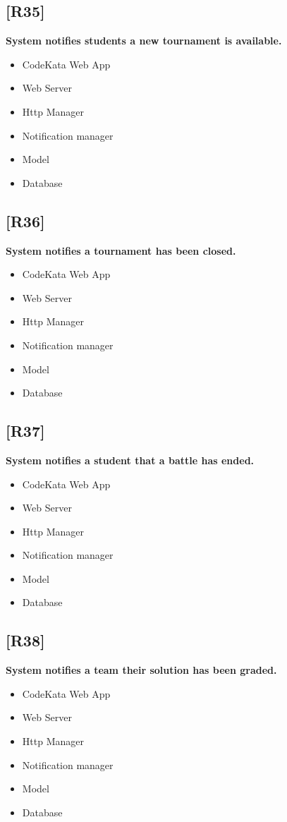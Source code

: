 \documentclass{article}
\begin{document}
\subsection{[R35]}
\textbf{ System notifies students a new tournament is available. }
\begin{itemize}
\item CodeKata Web App
\item Web Server
\item Http Manager
\item Notification manager
\item Model
\item Database
\end{itemize}
\subsection{[R36]}
\textbf{ System notifies a tournament has been closed.}
\begin{itemize}
\item CodeKata Web App
\item Web Server
\item Http Manager
\item Notification manager
\item Model
\item Database
\end{itemize}
\subsection{[R37]}
\textbf{ System notifies a student that a battle has ended.}
\begin{itemize}
\item CodeKata Web App
\item Web Server
\item Http Manager
\item Notification manager
\item Model
\item Database
\end{itemize}
\subsection{[R38]}
\textbf{ System notifies a team their solution has been graded.}
\begin{itemize}
\item CodeKata Web App
\item Web Server
\item Http Manager
\item Notification manager
\item Model
\item Database
\end{itemize}
\end{document}

